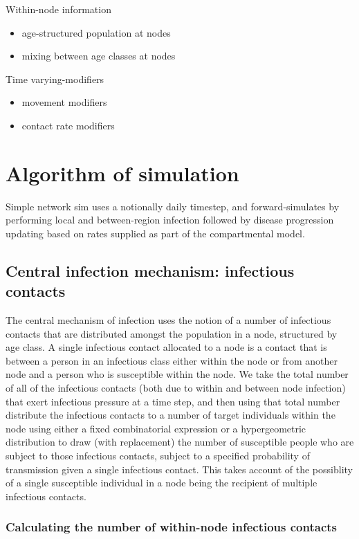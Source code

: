 \documentclass[11pt]{article}
\begin{document}
Within-node information
\begin{itemize}
\item age-structured population at nodes
\item mixing between age classes at nodes
\end{itemize}

Time varying-modifiers
\begin{itemize}
\item movement modifiers
\item contact rate modifiers
\end{itemize}

\section{Algorithm of simulation}

Simple network sim uses a notionally daily timestep, and forward-simulates by performing local and between-region infection followed by disease progression updating based on rates supplied as part of the compartmental model.

\subsection{Central infection mechanism: infectious contacts }

The central mechanism of infection uses the notion of a number of infectious contacts that are distributed amongst the population in a node, structured by age class.  A single infectious contact allocated to a node is a contact that is between a person in an infectious class either within the node or from another node and a person who is susceptible within the node.  We take the total number of all of the infectious contacts (both due to within and between node infection) that exert infectious pressure at a time step, and then using that total number distribute the infectious contacts to a number of target individuals within the node using either a fixed combinatorial expression or a hypergeometric distribution to draw (with replacement) the number of susceptible people who are subject to those infectious contacts, subject to a specified probability of transmission given a single infectious contact.  This takes account of the possiblity of a single susceptible individual in a node being the recipient of multiple infectious contacts.  

\subsubsection{Calculating the number of within-node infectious contacts}
\end{document}
